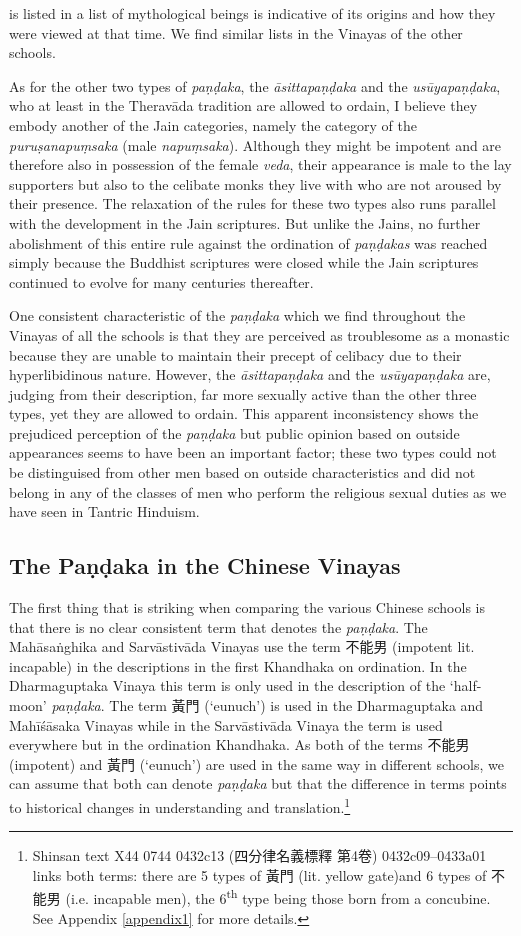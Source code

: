 is listed in a list of mythological beings is indicative of its origins and how they were viewed at that time. We find similar lists in the Vinayas of the other schools.

As for the other two types of {\em paṇḍaka}, the {\em āsittapaṇḍaka} and the {\em usūyapaṇḍaka}, who at least in the Theravāda tradition are allowed to ordain, I believe they embody another of the Jain categories, namely the category of the {\em puruṣanapuṃsaka} (male {\em napuṃsaka}). Although they might be impotent and are therefore also in possession of the female {\em veda}, their appearance is male to the lay supporters but also to the celibate monks they live with who are not aroused by their presence. The relaxation of the rules for these two types also runs parallel with the development in the Jain scriptures. But unlike the Jains, no further abolishment of this entire rule against the ordination of {\em paṇḍakas} was reached simply because the Buddhist scriptures were closed while the Jain scriptures continued to evolve for many centuries thereafter.

One consistent characteristic of the {\em paṇḍaka} which we find throughout the Vinayas of all the schools is that they are perceived as troublesome as a monastic because they are unable to maintain their precept of celibacy due to their hyperlibidinous nature. However, the {\em āsittapaṇḍaka} and the {\em usūyapaṇḍaka} are, judging from their description, far more sexually active than the other three types, yet they are allowed to ordain. This apparent inconsistency shows the prejudiced perception of the {\em paṇḍaka} but public opinion based on outside appearances seems to have been an important factor; these two types could not be distinguised from other men based on outside characteristics and did not belong in any of the classes of men who perform the religious sexual duties as we have seen in Tantric Hinduism.

\subsection{The Paṇḍaka in the Chinese Vinayas}
The first thing that is striking when comparing the various Chinese schools is that there is no clear consistent term that denotes the {\em paṇḍaka}. The Mahāsaṅghika and Sarvāstivāda Vinayas use the term 不能男 (impotent lit. incapable) in the descriptions in the first Khandhaka on ordination. In the Dharmaguptaka Vinaya this term is only used in the description of the `half-moon' {\em paṇḍaka}. The term 黃門 (`eunuch') is used in the Dharmaguptaka and Mahīśāsaka Vinayas while in the Sarvāstivāda Vinaya the term is used everywhere but in the ordination Khandhaka. As both of the terms 不能男 (impotent) and 黃門 (`eunuch') are used in the same way in different schools, we can assume that both can denote {\em paṇḍaka} but that the difference in terms points to historical changes in understanding and translation.\footnote{Shinsan text X44 0744 0432c13 (四分律名義標釋 第4卷) 0432c09–0433a01 links both terms: there are 5 types of 黃門 (lit. yellow gate)and 6 types of 不能男 (i.e. incapable men), the 6\textsuperscript{th} type being those born from a concubine. See Appendix \ref{appendix1} for more details.}

